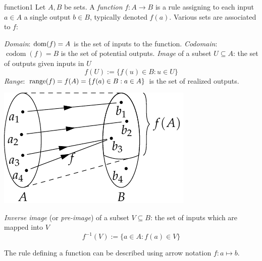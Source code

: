 \begin{defn}{}{function1}
	Let $A,B$ be sets. A \emph{function} $f:A\to B$ is a rule assigning to each input $a\in A$ a single output $b\in B$, typically denoted $f(a)$.	Various sets are associated to $f$:\par
	\begin{minipage}[t]{0.61\linewidth}\vspace{-5pt}
	\emph{Domain}: $\operatorname{dom}(f)=A$ is the set of inputs to the function.\smallbreak
	\emph{Codomain}: $\operatorname{codom}(f)=B$ is the set of potential outputs.\smallbreak
	\emph{Image} of a subset $U\subseteq A$: the set of outputs given inputs in $U$
	\[
		f(U):=\bigl\{f(u)\in B:u\in U\bigr\}
	\]
	\emph{Range}: $\operatorname{range}(f)=f(A)=\{f(a)\in B:a\in A\}$ is the set of realized outputs.
		\end{minipage}
		\hfill
		\begin{minipage}[t]{0.38\linewidth}\vspace{-3pt}
			\flushright
   		\includegraphics[scale=1]{sets-16-funcdef2}
		\end{minipage}\medbreak
	\emph{Inverse image} (or \emph{pre-image}) of a subset $V\subseteq B$: the set of inputs which are mapped into $V$
	\[
		f^{-1}(V):=\bigl\{a\in A:f(a)\in V\bigr\}
	\]
\end{defn}

The rule defining a function can be described using arrow notation $f:a\mapsto b$.

